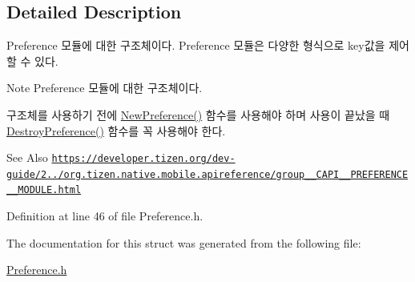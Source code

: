 \subsection{Detailed Description}
Preference 모듈에 대한 구조체이다. Preference 모듈은 다양한 형식으로 key값을 제어 할 수 있다. 

\begin{DoxyNote}{Note}
Preference 모듈에 대한 구조체이다. \par
 구조체를 사용하기 전에 \hyperlink{Preference_8h_ac230ae82d235023850371be1c8e281fb}{New\-Preference()} 함수를 사용해야 하며 사용이 끝났을 때 \hyperlink{Preference_8h_afb9b36e8c53758ed9f012b907e1a17c4}{Destroy\-Preference()} 함수를 꼭 사용해야 한다. 
\end{DoxyNote}
\begin{DoxySeeAlso}{See Also}
\href{https://developer.tizen.org/dev-guide/2.3.0/org.tizen.native.mobile.apireference/group__CAPI__PREFERENCE__MODULE.html}{\tt https\-://developer.\-tizen.\-org/dev-\/guide/2../org.\-tizen.\-native.\-mobile.\-apireference/group\-\_\-\-\_\-\-C\-A\-P\-I\-\_\-\-\_\-\-P\-R\-E\-F\-E\-R\-E\-N\-C\-E\-\_\-\-\_\-\-M\-O\-D\-U\-L\-E.\-html} 
\end{DoxySeeAlso}


Definition at line 46 of file Preference.\-h.



The documentation for this struct was generated from the following file\-:\begin{DoxyCompactItemize}
\item 
\hyperlink{Preference_8h}{Preference.\-h}\end{DoxyCompactItemize}
